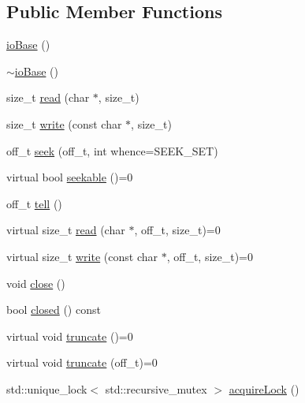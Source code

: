 \subsection*{Public Member Functions}
\begin{DoxyCompactItemize}
\item 
\mbox{\hyperlink{classebml_1_1ioBase_af0d31f731961fad7d3db80ba51a44ad1}{io\+Base}} ()
\item 
\mbox{\hyperlink{classebml_1_1ioBase_a97917f5c8816a035e3bc3f2e300da596}{$\sim$io\+Base}} ()
\item 
size\+\_\+t \mbox{\hyperlink{classebml_1_1ioBase_a3c2cd427ce1fd34a93959778a3fd4efa}{read}} (char $\ast$, size\+\_\+t)
\item 
size\+\_\+t \mbox{\hyperlink{classebml_1_1ioBase_a3895c5e0f86ecdcedaa288e87d68ccad}{write}} (const char $\ast$, size\+\_\+t)
\item 
off\+\_\+t \mbox{\hyperlink{classebml_1_1ioBase_ac4a5db64f2c7c8e791039f1b269d8f1a}{seek}} (off\+\_\+t, int whence=S\+E\+E\+K\+\_\+\+S\+ET)
\item 
virtual bool \mbox{\hyperlink{classebml_1_1ioBase_a413541f633f97d68021cbf58837e1970}{seekable}} ()=0
\item 
off\+\_\+t \mbox{\hyperlink{classebml_1_1ioBase_af0911dd01f1bb6a7ab284770c178db59}{tell}} ()
\item 
virtual size\+\_\+t \mbox{\hyperlink{classebml_1_1ioBase_aba93b64f19016207b3d6c43183a2be07}{read}} (char $\ast$, off\+\_\+t, size\+\_\+t)=0
\item 
virtual size\+\_\+t \mbox{\hyperlink{classebml_1_1ioBase_ad4a000de5db86375be0bf338130f76c9}{write}} (const char $\ast$, off\+\_\+t, size\+\_\+t)=0
\item 
void \mbox{\hyperlink{classebml_1_1ioBase_a802fbbe754413842f45251daa8294965}{close}} ()
\item 
bool \mbox{\hyperlink{classebml_1_1ioBase_a9dea7dea0e8d87a537e652e7f40128e9}{closed}} () const
\item 
virtual void \mbox{\hyperlink{classebml_1_1ioBase_a4cd6d91c2bb18a21c0fec425432b58c3}{truncate}} ()=0
\item 
virtual void \mbox{\hyperlink{classebml_1_1ioBase_ae1a40372ba926becab957ae0b054492e}{truncate}} (off\+\_\+t)=0
\item 
std\+::unique\+\_\+lock$<$ std\+::recursive\+\_\+mutex $>$ \mbox{\hyperlink{classebml_1_1ioBase_a8414aaadabbfdc746e810527bc76a93d}{acquire\+Lock}} ()
\end{DoxyCompactItemize}
